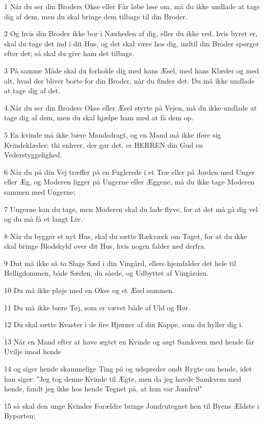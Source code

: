 \par 1 Når du ser din Broders Okse eller Får løbe løse om, må du ikke undlade at tage dig af dem, men du skal bringe dem tilbage til din Broder.
\par 2 Og hvis din Broder ikke bor i Nærheden af dig, eller du ikke ved, hvis byret er, skal du tage det ind i dit Hus, og det skal være hos dig, indtil din Broder spørger efter det; så skal du give ham det tilbage.
\par 3 På samme Måde skal du forholde dig med hans Æsel, med hans Klæder og med alt, hvad der bliver borte for din Broder, når du finder det. Du må ikke undlade at tage dig af det.
\par 4 Når du ser din Broders Okse eller Æsel styrte på Vejen, må du ikke undlade at tage dig af dem, men du skal hjælpe ham med at få dem op.
\par 5 En kvinde må ikke bære Mandsdragt, og en Mand må ikke iføre sig Kvindeklæder; thi enhver, der gør det, er HERREN din Gud en Vederstyggelighed.
\par 6 Når du på din Vej træffer på en Fuglerede i et Træ eller på Jorden med Unger eller Æg, og Moderen ligger på Ungerne eller Æggene, må du ikke tage Moderen sammen med Ungerne;
\par 7 Ungerne kan du tage, men Moderen skal du lade flyve, for at det må gå dig vel og du må få et langt Liv.
\par 8 Når du bygger et nyt Hus, skal du sætte Rækværk om Taget, for at du ikke skal bringe Blodskyld over dit Hus, hvis nogen falder ned derfra.
\par 9 Dut må ikke så to Slags Sæd i din Vingård, ellers hjemfalder det hele til Helligdommen, både Sæden, du såede, og Udbyttet af Vingården.
\par 10 Du må ikke pløje med en Okse og et Æsel sammen.
\par 11 Du må ikke bære Tøj, som er vævet både af Uld og Hør.
\par 12 Du skal sætte Kvaster i de fire Hjørner af din Kappe, som du hyller dig i.
\par 13 Når en Mand efter at have ægtet en Kvinde og søgt Samkvem med hende får Uvilje imod hende
\par 14 og siger hende skammelige Ting på og udspreder ondt Rygte om hende, idet han siger: "Jeg tog denne Kvinde til Ægte, men da jeg havde Samkvem med hende, fandt jeg ikke hos hende Tegnet på, at hun var Jomfru!"
\par 15 så skal den unge Kvindes Forældre bringe Jomfrutegnet hen til Byens Ældste i Byporten;
